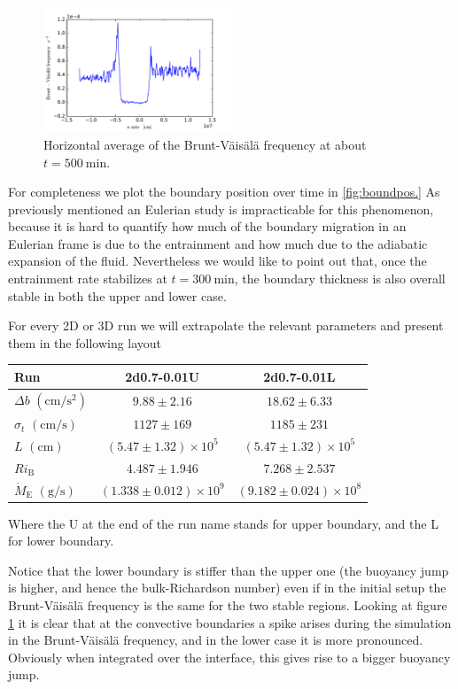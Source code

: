  \begin{figure}[t!]
\centering
\includegraphics[width=0.5\textwidth]{./img/brunt}
\caption{Horizontal average of the Brunt-Väisälä frequency at about $t=500 \ \mathrm{min}$.}
\label{fig:brunt}
\centering
\end{figure}
For completeness we plot the boundary position over time in \ref{fig:boundpos.} As previously mentioned an Eulerian study is impracticable for this phenomenon, because it is hard to quantify how much of the boundary migration in an Eulerian frame is due to the entrainment and how much due to the adiabatic expansion of the fluid. Nevertheless we would like to point out that, once the entrainment rate stabilizes at $t=300 \ \mathrm{min}$, the boundary thickness is also overall stable in both the upper and lower case. 

For every 2D or 3D run we will extrapolate the relevant parameters and present them in the following layout
\begin{center}
 \begin{tabular}{l|c|c}
	 Run &2d0.7-0.01U&2d0.7-0.01L\\
	  	\hline
	   $\Delta b$ $(\mathrm{cm/s^{2}})$&$ 9.88 \pm 2.16 $&$18.62 \pm 6.33$\\
		\hline
	   $\sigma_t$ $(\mathrm{cm/s})$ &$ 1127 \pm 169 $&$1185 \pm 231$\\
		\hline
	   $L$ $(\mathrm{cm})$&$(5.47 \pm 1.32) \times 10^5$&$(5.47 \pm 1.32) \times 10^5$\\
		\hline
	   $Ri_{\mathrm{B}}$& $4.487 \pm 1.946 $&$7.268 \pm 2.537$\\
		\hline
	   $\dot{M}_{\mathrm{E}}$ $(\mathrm{g/s})$ &$(1.338 \pm 0.012) \times 10^9$&$(9.182 \pm 0.024) \times 10^8$\\
      \end{tabular}
 \end{center}
 Where the U at the end of the run name stands for upper boundary, and the L for lower boundary. 

 Notice that the lower boundary is stiffer than the upper one (the buoyancy jump is higher, and hence the bulk-Richardson number) even if in the initial setup the Brunt-Väisälä frequency is the same for the two stable regions. Looking at figure \ref{fig:brunt} it is clear that at the convective boundaries a spike arises during the simulation in the Brunt-Väisälä frequency, and in the lower case it is more pronounced. Obviously when integrated over the interface, this gives rise to a bigger buoyancy jump.


